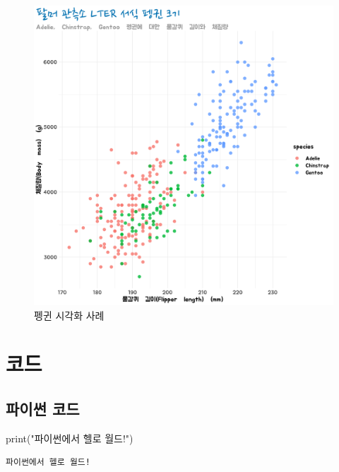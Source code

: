 \documentclass[
  letterpaper,
  DIV=11,
  numbers=noendperiod]{scrartcl}
\newenvironment{Shaded}{\begin{snugshade}}{\end{snugshade}}
\newcommand{\BuiltInTok}[1]{\textcolor[rgb]{0.00,0.23,0.31}{#1}}
\newcommand{\NormalTok}[1]{\textcolor[rgb]{0.00,0.23,0.31}{#1}}
\newcommand{\StringTok}[1]{\textcolor[rgb]{0.13,0.47,0.30}{#1}}
\begin{document}
\begin{figure}

{\centering \includegraphics{images/penguins.png}

}

\caption{펭귄 시각화 사례}

\end{figure}

\hypertarget{uxcf54uxb4dc}{%
\section{코드}\label{uxcf54uxb4dc}}

\hypertarget{uxd30cuxc774uxc36c-uxcf54uxb4dc}{%
\subsection{파이썬 코드}\label{uxd30cuxc774uxc36c-uxcf54uxb4dc}}

\begin{Shaded}
\begin{Highlighting}[]
\BuiltInTok{print}\NormalTok{(}\StringTok{"파이썬에서 헬로 월드!"}\NormalTok{)}
\end{Highlighting}
\end{Shaded}

\begin{verbatim}
파이썬에서 헬로 월드!
\end{verbatim}
\end{document}
